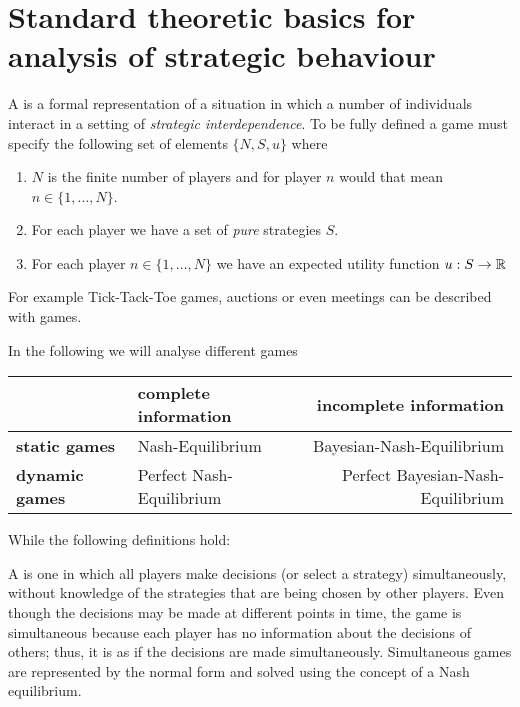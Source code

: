 

\chapter{Standard theoretic basics for analysis of strategic behaviour}

A  is a formal representation of a situation in which a number of individuals interact in a setting of \textit{strategic interdependence}.
To be fully defined a game must specify the following set of elements $\{ N, S, u \}$ where
	\begin{enumerate}
		\item $N$ is the finite number of players and for player $n$ would that mean $n \in \{ 1, \dotsc, N \}$.
		\item For each player we have a set of \textit{pure} strategies $S$.
		\item For each player $n \in \{1, \dotsc, N \}$ we have an expected utility function $u : S \rightarrow \mathbb{R}$
	\end{enumerate}

For example Tick-Tack-Toe games, auctions or even meetings can be described with games. 

In the following we will analyse different games 

\begin{tabular}{|l|l|r|}
	\hline\hline
  			& {\textbf{complete information}} & {\textbf{incomplete information}} \\
                                                    \hline
   \textbf{static games} & Nash-Equilibrium & Bayesian-Nash-Equilibrium\arrayrulewidth2pt \\
                                               \cline{1-3}
   \textbf{dynamic games} & Perfect Nash-Equilibrium & Perfect Bayesian-Nash-Equilibrium \\ \hline\hline
\end{tabular}

While the following definitions hold:

\begin{definition}
	A  is one in which all players make decisions (or select a strategy) simultaneously, without knowledge of the strategies that are being chosen by other players. Even though the decisions may be made at different points in time, the game is simultaneous because each player has no information about the decisions of others; thus, it is as if the decisions are made simultaneously. Simultaneous games are represented by the normal form and solved using the concept of a Nash equilibrium.
\end{definition}

